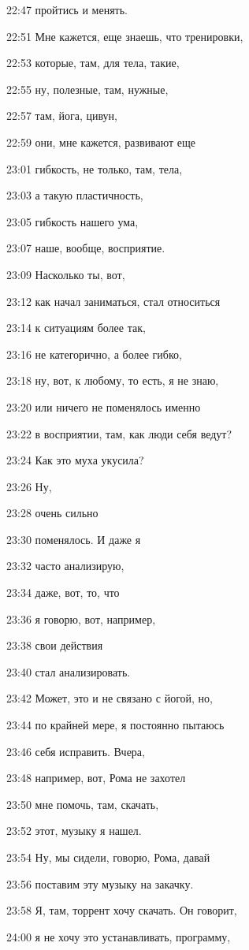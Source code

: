 22:47
пройтись и менять.

22:51
Мне кажется, еще знаешь, что тренировки,

22:53
которые, там, для тела, такие,

22:55
ну, полезные, там, нужные,

22:57
там, йога, цивун,

22:59
они, мне кажется, развивают еще

23:01
гибкость, не только, там, тела,

23:03
а такую пластичность,

23:05
гибкость нашего ума,

23:07
наше, вообще, восприятие.

23:09
Насколько ты, вот,

23:12
как начал заниматься, стал относиться

23:14
к ситуациям более так,

23:16
не категорично, а более гибко,

23:18
ну, вот, к любому, то есть, я не знаю,

23:20
или ничего не поменялось именно

23:22
в восприятии, там, как люди себя ведут?

23:24
Как это муха укусила?

23:26
Ну,

23:28
очень сильно

23:30
поменялось. И даже я

23:32
часто анализирую,

23:34
даже, вот, то, что

23:36
я говорю, вот, например,

23:38
свои действия

23:40
стал анализировать.

23:42
Может, это и не связано с йогой, но,

23:44
по крайней мере, я постоянно пытаюсь

23:46
себя исправить. Вчера,

23:48
например, вот, Рома не захотел

23:50
мне помочь, там, скачать,

23:52
этот, музыку я нашел.

23:54
Ну, мы сидели, говорю, Рома, давай

23:56
поставим эту музыку на закачку.

23:58
Я, там, торрент хочу скачать. Он говорит,

24:00
я не хочу это устанавливать, программу,

